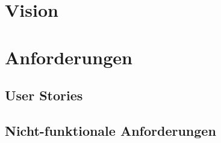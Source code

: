 \chapter{Vision}

\xxx

\chapter{Anforderungen}

\xxx

\section{User Stories}\label{sec:pd:user-stories}

\xxx

\section{Nicht-funktionale Anforderungen}

\xxx
